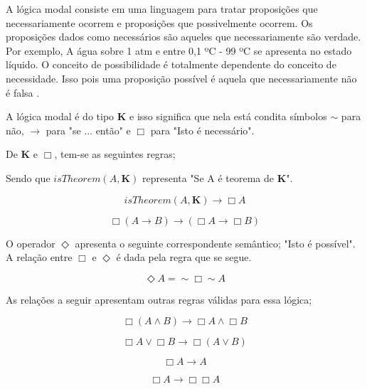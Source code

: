 A lógica modal consiste em uma linguagem para tratar proposições que necessariamente ocorrem e proposições que possivelmente ocorrem. Os proposições dados como necessários são aqueles que necessariamente são verdade. Por exemplo, A água sobre 1 atm e entre 0,1 ºC - 99 ºC se apresenta no estado líquido. O conceito de possibilidade é totalmente dependente do conceito de necessidade. Isso pois 
uma proposição possível é aquela que necessariamente não é falsa \cite{modallogic}. 

A lógica modal é do tipo \textbf{K} e isso significa que nela está condita símbolos $ \sim $ para não, $ \rightarrow$ para "se ... então" e $\Box$ para "Isto é necessário". 

De \textbf{K} e $\Box$, tem-se as seguintes regras;

Sendo que $isTheorem(A,\textbf{K})$ representa "Se A é teorema de \textbf{K}". 

\begin{equation} 
isTheorem(A,\textbf{K}) \rightarrow \Box A
\end{equation}
\label{ktheorema}

\begin{equation} 
 \Box (A \rightarrow B) \rightarrow (\Box A \rightarrow \Box B) 
\end{equation}
\label{boxdist}

O operador $\Diamond$ apresenta o seguinte correspondente semântico; "Isto é possível". A relação entre $\Box$ e $\Diamond$ é dada pela regra que se segue.

\begin{equation} 
 \Diamond A = \sim\Box\sim A
\end{equation}
\label{dianotboxnota}

As relações a seguir apresentam outras regras válidas para essa lógica;

\begin{equation} 
 \Box (A \wedge B)  \rightarrow \Box A \wedge \Box B
\end{equation}
\label{boxand}

\begin{equation} 
 \Box A \vee \Box B \rightarrow \Box (A \vee B)
\end{equation}
\label{boxaor}

\begin{equation} 
 \Box A \rightarrow A
\end{equation}
\label{boxtoa}

\begin{equation} 
    \Box A \rightarrow \Box\Box A
\end{equation}
\label{aboxbox}

